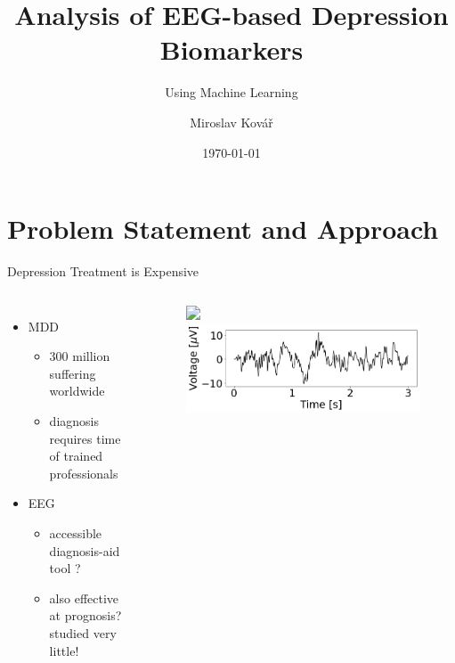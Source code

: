\documentclass{beamer}
\title{Analysis of EEG-based Depression Biomarkers}
\subtitle{Using Machine Learning}
\author{Miroslav Kovář}
\institute{FJFI}
\date{\today}
\begin{document}

\begin{frame}
	\maketitle %
\end{frame}


\section{Problem Statement and Approach} 
\begin{frame}{Depression Treatment is Expensive}
	\begin{columns}
        \begin{itemize}
          \item MDD
            \begin{itemize}
              \item<2-> 300 million suffering worldwide \cite{olbrich2013eeg, whodepression}
              \item<3-> diagnosis requires time of trained professionals \cite{whodepression}
            \end{itemize}
          \item EEG 
            \begin{itemize}
              \item<4-> accessible diagnosis-aid tool \cite{schultz2012}?
              \item<5-> also effective at prognosis? {\scriptsize studied very little!} 
            \end{itemize}
        \end{itemize}
        \vfill
            \begin{figure}
                \includegraphics<1->[width=0.9\linewidth]{./Images/electrodes.png}
                \caption{\scriptsize \cite{10-20-system}}
                \includegraphics[width=\linewidth]{./Images/signal.png}
            \end{figure}
	\end{columns}
\end{frame}
\end{document}
